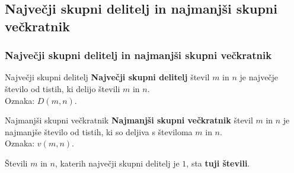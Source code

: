 

    \subsection{Največji skupni delitelj in najmanjši skupni večkratnik}

        \begin{frame}
            \frametitle{Največji skupni delitelj in najmanjši skupni večkratnik}

            \begin{alertblock}{Največji skupni delitelj}
                \textbf{Največji skupni delitelj} števil $m$ in $n$ je največje število od tistih, ki delijo števili $m$ in $n$. \\
                Oznaka: $D(m,n)$.                
            \end{alertblock}

            \begin{alertblock}{Najmanjši skupni večkratnik}
                \textbf{Najmanjši skupni večkratnik} števil $m$ in $n$ je najmanjše število od tistih, ki so deljiva s številoma $m$ in $n$. \\
                Oznaka: $v(m,n)$.
            \end{alertblock}

            \begin{block}{}
                Števili $m$ in $n$, katerih največji skupni delitelj je $1$, sta \textbf{tuji števili}.
            \end{block}
        \end{frame}

